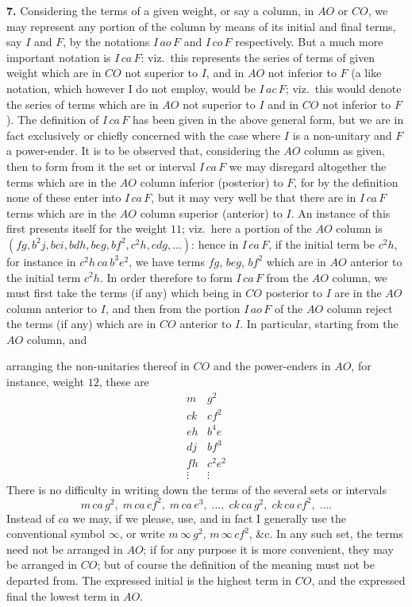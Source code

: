\documentclass[11pt]{article}
\begin{document}
\textbf{7.} Considering the terms of a given weight, or say a column, in $AO$ or $CO$, we may represent any portion of the column by means of its initial and final terms, say $I$ and $F$, by the notations $I\,ao\,F$ and $I\,co\,F$ respectively. But a much more important notation is $I\,ca\,F$: viz.\ this represents the series of terms of given weight which are in $CO$ not superior to $I$, and in $AO$ not inferior to $F$ (a like notation, which however I do not employ, would be $I\,ac\,F$; viz.\ this would denote the series of terms which are in $AO$ not superior to $I$ and in $CO$ not inferior to $F$). The definition of $I\,ca\,F$ has been given in the above general form, but we are in fact exclusively or chiefly concerned with the case where $I$ is a non-unitary and $F$ a power-ender. It is to be observed that, considering the $AO$ column as given, then to form from it the set or interval $I\,ca\,F$ we may disregard altogether the terms which are in the $AO$ column inferior (posterior) to $F$, for by the definition none of these enter into $I\,ca\,F$, but it may very well be that there are in $I\,ca\,F$ terms which are in the $AO$ column superior (anterior) to $I$. An instance of this first presents itself for the weight $11$; viz.\ here a portion of the $AO$ column is $(fg, b^2 j, bci, bdh, beg, bf^2, c^2 h, cdg, \ldots)$: hence in $I\,ca\,F$, if the initial term be $c^2 h$, for instance in $c^2 h\,ca\,b^3 e^2$, we have terms $fg$, $beg$, $bf^2$ which are in $AO$ anterior to the initial term $c^2 h$. In order therefore to form $I\,ca\,F$ from the $AO$ column, we must first take the terms (if any) which being in $CO$ posterior to $I$ are in the $AO$ column anterior to $I$, and then from the portion $I\,ao\,F$ of the $AO$ column reject the terms (if any) which are in $CO$ anterior to $I$. In particular, starting from the $AO$ column, and

arranging the non-unitaries thereof in $CO$ and the power-enders in $AO$, for instance, weight $12$, these are
\[
\begin{array}{ll}
m & g^2 \\
ck & cf^2 \\
eh & b^4 e \\
dj & bf^3 \\
fh & c^2 e^2 \\
\vdots & \vdots
\end{array}
\]
There is no difficulty in writing down the terms of the several sets or intervals
\[
m\,ca\,g^2,\; m\,ca\,cf^2,\; m\,ca\,e^3,\; \ldots,\; ck\,ca\,g^2,\; ck\,ca\,cf^2,\; \ldots.
\]
Instead of $ca$ we may, if we please, use, and in fact I generally use the conventional symbol $\infty$, or write $m\,\infty\,g^2$, $m\,\infty\,cf^2$, \&c. In any such set, the terms need not be arranged in $AO$; if for any purpose it is more convenient, they may be arranged in $CO$; but of course the definition of the meaning must not be departed from. The expressed initial is the highest term in $CO$, and the expressed final the lowest term in $AO$.
\end{document}
